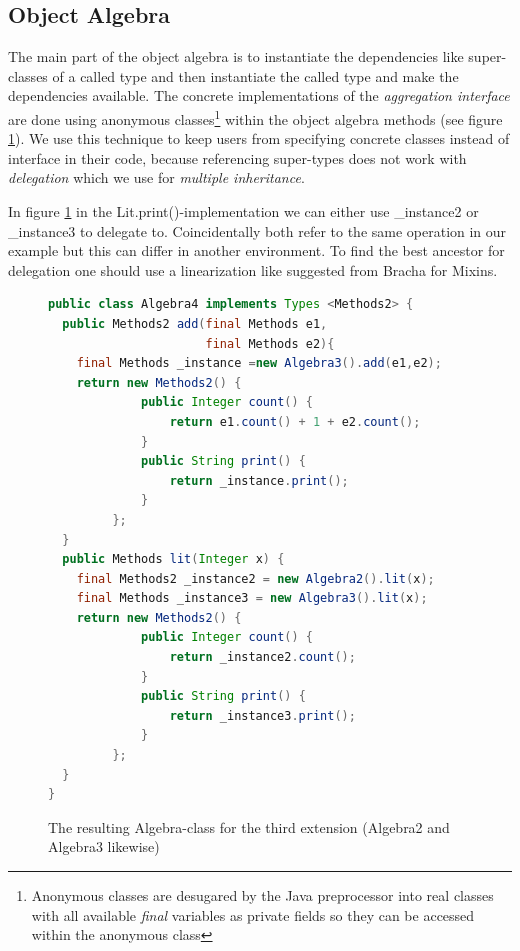 \documentclass{report}
\begin{document}
\subsection{Object Algebra}

The main part of the object algebra is to instantiate the dependencies like super-classes of a called type and then instantiate the called type and make the dependencies available. The concrete implementations of the \emph{aggregation interface} are done using anonymous classes\footnote{Anonymous classes are desugared by the Java preprocessor into real classes with all available \emph{final} variables as private fields so they can be accessed within the anonymous class} within the object algebra methods (see figure \ref{algebraImplementation}). We use this technique to keep users from specifying concrete classes instead of interface in their code, because referencing super-types does not work with \emph{delegation} which we use for \emph{multiple inheritance}.

In figure \ref{algebraImplementation} in the Lit.print()-implementation we can either use \_instance2 or \_instance3 to delegate to. Coincidentally both refer to the same operation in our example but this can differ in another environment. To find the best ancestor for delegation one should use a linearization like suggested from Bracha \cite{Bracha-Mixin-1990} for Mixins.

\begin{figure}[H]
\begin{lstlisting}[language=java]
public class Algebra4 implements Types <Methods2> {
  public Methods2 add(final Methods e1,
                      final Methods e2){
    final Methods _instance =new Algebra3().add(e1,e2);
    return new Methods2() {
             public Integer count() {
                 return e1.count() + 1 + e2.count();
             }
             public String print() {
                 return _instance.print();
             }
         };
  }
  public Methods lit(Integer x) { 
    final Methods2 _instance2 = new Algebra2().lit(x);
    final Methods _instance3 = new Algebra3().lit(x);
    return new Methods2() {
             public Integer count() { 
                 return _instance2.count();
             }
             public String print() { 
                 return _instance3.print();
             }
         };
  }
}
\end{lstlisting}
\caption{The resulting Algebra-class for the third extension (Algebra2 and Algebra3 likewise)}
\label{algebraImplementation}
\end{figure}
\end{document}
